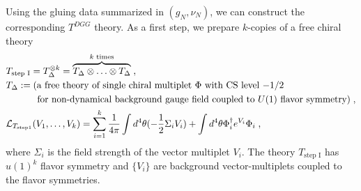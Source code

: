 \documentclass[a4paper,11pt]{article}
\begin{document}
Using the gluing data summarized in $(g_N, \nu_N)$, we can construct the corresponding $T^{DGG}$ theory. 
As a first step, we prepare $k$-copies of a free chiral theory 
%
\begin{align}
\begin{split}
&T_{\textrm{step I}} = T_\Delta^{\otimes k} = \overbrace{T_\Delta \otimes \ldots \otimes T_{\Delta}}^{\textrm{$k$ times}}\;,
\\
& T_{\Delta}  := (\textrm{a free theory of single chiral multiplet $\Phi$ with  CS level $-1/2$}
\\
&  \quad \quad \quad \textrm{ for non-dynamical background gauge field coupled to $U(1)$ flavor symmetry})\;,
\\
&\mathcal{L}_{T_{\rm step 1}} (V_1,\ldots , V_k) = \sum_{i=1}^k \frac{1}{4\pi}\int d^4\theta (- \frac{1}2 \Sigma_{i} V_{i})   +\int d^4\theta \Phi_{i}^\dagger e^{V_{i}} \Phi_i\;,
\label{DGG : step 1}
\end{split}
\end{align}
%
where $\Sigma_i$ is the field strength of the vector multiplet $V_i$.
The theory $T_{\textrm{step I}}$ has $u(1)^k$ flavor symmetry and  $\{V_i\}$ are background vector-multiplets  coupled to the flavor symmetries. 
\end{document}
